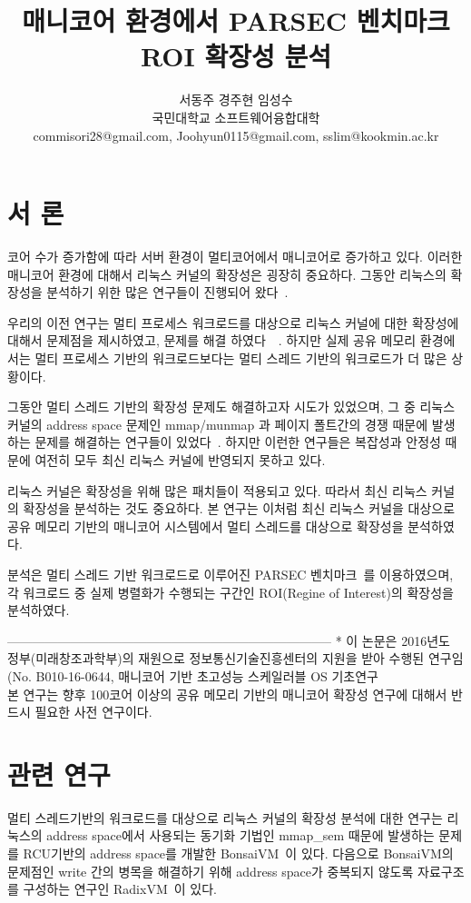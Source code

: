 \documentclass{kcc}
\title{매니코어 환경에서 PARSEC 벤치마크 ROI 확장성 분석}
\author{%
서동주 경주현 임성수\\
국민대학교 소프트웨어융합대학\\
commisori28@gmail.com, Joohyun0115@gmail.com, sslim@kookmin.ac.kr  
}
\begin{document}
\maketitle

\section{서 론}
코어 수가 증가함에 따라 서버 환경이 멀티코어에서 매니코어로 증가하고 있다. 
이러한 매니코어 환경에 대해서 리눅스 커널의 확장성은 굉장히 중요하다. 
그동안 리눅스의 확장성을 분석하기 위한 많은 연구들이 진행되어 왔다~\cite{Etri}. 

우리의 이전 연구는 멀티 프로세스 워크로드를 대상으로 리눅스 커널에 대한 확장성에 
대해서 문제점을 제시하였고, 문제를 해결 하였다~\cite{kesl1}~\cite{kesl2}. 
하지만 실제 공유 메모리 환경에서는 멀티 프로세스 기반의 워크로드보다는 멀티 스레드 기반의 
워크로드가 더 많은 상황이다.

그동안 멀티 스레드 기반의 확장성 문제도 해결하고자 시도가 있었으며, 
그 중 리눅스 커널의 address space 문제인 mmap/munmap 과 페이지 폴트간의 경쟁 
때문에 발생하는 문제를 해결하는 연구들이 있었다~\cite{AustinTClements2012RCUBalancedTrees}. 
하지만 이런한 연구들은 복잡성과 안정성 때문에 
여전히 모두 최신 리눅스 커널에 반영되지 못하고 있다.

리눅스 커널은 확장성을 위해 많은 패치들이 적용되고 있다. 
따라서 최신 리눅스 커널의 확장성을 분석하는 것도 중요하다. 
본 연구는 이처럼 최신 리눅스 커널을 대상으로 
공유 메모리 기반의 매니코어 시스템에서 멀티 스레드를 
대상으로 확장성을 분석하였다.

분석은 멀티 스레드 기반 워크로드로 이루어진 PARSEC 벤치마크~\cite{parsecbench}를 이용하였으며, 각 워크로드 중
실제 병렬화가 수행되는 구간인 ROI(Regine of Interest)의 확장성을 분석하였다. 

-----------------------------------------------------------------------------
* 이 논문은 2016년도 정부(미래창조과학부)의 재원으로 정보통신기술진흥센터의 지원을 받아 수행된 연구임  (No. B010-16-0644, 매니코어 기반 초고성능 스케일러블 OS 기초연구
\\

본 연구는 향후 100코어 이상의 공유 메모리 기반의 매니코어 확장성 연구에 대해서 
반드시 필요한 사전 연구이다.


\section{관련 연구}

멀티 스레드기반의 워크로드를 대상으로 리눅스 커널의 확장성 분석에 대한 연구는 리눅스의 
address space에서 사용되는 동기화 기법인 mmap\_sem 때문에 발생하는 문제를 RCU기반의 
address space를 개발한 BonsaiVM~\cite{AustinTClements2012RCUBalancedTrees}이 있다.
다음으로 BonsaiVM의 문제점인 write 간의 병목을 해결하기 위해 address space가 중복되지 
않도록 자료구조를 구성하는 연구인 RadixVM~\cite{Clements2013RadixVM}이 있다.
\end{document}
